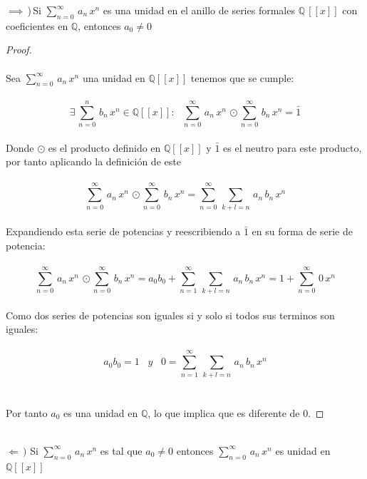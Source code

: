 \documentclass[11pt,letterpaper]{article}
\newcommand{\Q}{\mathbb{Q}}
\begin{document}
    $\implies$\,)\,Si $\displaystyle \sum_{n=0}^{\infty}\,a_n\,x^n$ es una unidad en el anillo de series formales $\Q\,[[x]]$
con coeficientes en $\Q$, entonces $a_0\neq 0$\,\\
\begin{proof}\,\\
    \,\\
    Sea  $\displaystyle \sum_{n=0}^{\infty}\,a_n\,x^n$ una unidad en $\Q[[x]]$ tenemos que se cumple:\,\\
    \,\\
    \begin{equation*}
      \exists\,\sum_{n=0}^{n}\,b_n\,x^n\in \Q[[x]]:\,\,\,\,\sum_{n=0}^{\infty}\,a_n\,x^n\,\odot \sum_{n=0}^{\infty}\,b_n\,x^n=\bar{1}
    \end{equation*}\,\\
    Donde $\odot$ es el producto definido en $\Q[[x]]$ y $\bar{1}$ es el neutro para este producto, por tanto aplicando la definici\'on de este\,\\
    \,\\
    \begin{equation*}
        \sum_{n=0}^{\infty}\,a_n\,x^n\,\odot \sum_{n=0}^{\infty}\,b_n\,x^n=\sum_{n=0}^{\infty}\,\sum_{k+l=n}\,a_n\,b_n\,x^n
    \end{equation*}\,\\
    Expandiendo esta serie de potencias y reescribiendo a $\bar{1}$ en su forma de serie de potencia:\,\\
    \,\\
    \begin{equation*}
        \sum_{n=0}^{\infty}\,a_n\,x^n\,\odot \sum_{n=0}^{\infty}\,b_n\,x^n=a_0b_0+\sum_{n=1}^{\infty}\,\sum_{k+l=n}\,a_n\,b_n\,x^n=1+\sum_{n=0}^{\infty}\,0\,x^n
    \end{equation*}\,\\
    Como dos series de potencias son iguales si y solo si todos sus terminos son iguales:\,\\
    \,\\
    \begin{equation*}
        a_0b_0=1\,\,\,\,\,y\,\,\,\,\,0=\sum_{n=1}^{\infty}\,\sum_{k+l=n}\,a_n\,b_n\,x^n
    \end{equation*}\,\\
    \,\\
    Por tanto $a_0$ es una unidad en $\Q$, lo que implica que es diferente de $0$.
\end{proof}\,\\
$\Leftarrow\,)$\,\,Si $\displaystyle \sum_{n=0}^{\infty}\,a_n\,x^n$ es tal que $a_0\neq 0$ entonces $\displaystyle \sum_{n=0}^{\infty}\,a_n\,x^n$ es unidad en $\Q[[x]]$\,\\
\end{document}
